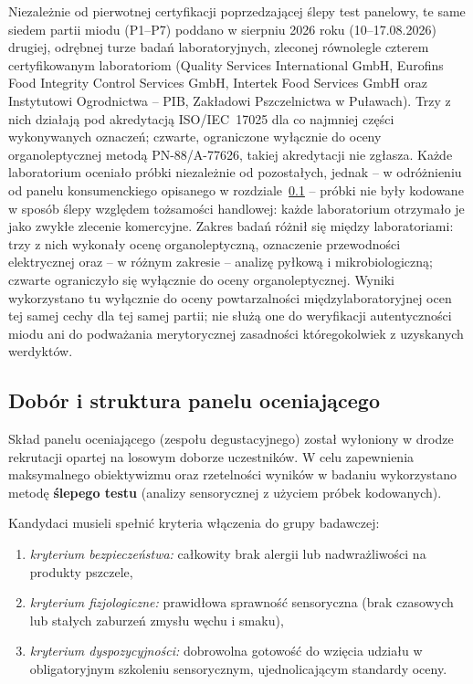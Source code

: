 \documentclass[12pt,a4paper]{article}
\begin{document}
Niezależnie od pierwotnej certyfikacji poprzedzającej ślepy test panelowy, te same
siedem partii miodu (P1--P7) poddano w sierpniu 2026 roku (10--17.08.2026) drugiej,
odrębnej turze badań laboratoryjnych, zleconej równolegle czterem certyfikowanym
laboratoriom (Quality Services International GmbH, Eurofins Food Integrity Control
Services GmbH, Intertek Food Services GmbH oraz Instytutowi Ogrodnictwa -- PIB, Zakładowi
Pszczelnictwa w Puławach). Trzy z nich działają pod akredytacją ISO/IEC~17025 dla co
najmniej części wykonywanych oznaczeń; czwarte, ograniczone wyłącznie do oceny
organoleptycznej metodą PN-88/A-77626, takiej akredytacji nie zgłasza. Każde
laboratorium oceniało próbki niezależnie od pozostałych, jednak -- w odróżnieniu od
panelu konsumenckiego opisanego w rozdziale~\ref{sub:dobor_panelu} -- próbki nie były
kodowane w sposób ślepy względem tożsamości handlowej: każde laboratorium otrzymało je
jako zwykłe zlecenie komercyjne. Zakres badań różnił się między laboratoriami: trzy z
nich wykonały ocenę organoleptyczną, oznaczenie przewodności elektrycznej oraz -- w
różnym zakresie -- analizę pyłkową i mikrobiologiczną; czwarte ograniczyło się wyłącznie
do oceny organoleptycznej. Wyniki wykorzystano tu wyłącznie do oceny powtarzalności
międzylaboratoryjnej ocen tej samej cechy dla tej samej partii; nie służą one do
weryfikacji autentyczności miodu ani do podważania merytorycznej zasadności
któregokolwiek z uzyskanych werdyktów.

\subsection{Dobór i struktura panelu oceniającego}
\label{sub:dobor_panelu}

Skład panelu oceniającego (zespołu degustacyjnego) został wyłoniony w drodze rekrutacji opartej na losowym doborze uczestników. W celu zapewnienia maksymalnego obiektywizmu oraz rzetelności wyników w badaniu wykorzystano metodę \textbf{ślepego testu} (analizy sensorycznej z użyciem próbek kodowanych).

Kandydaci musieli spełnić kryteria włączenia do grupy badawczej:
\begin{enumerate}[label=\roman*.]
    \item \textit{kryterium bezpieczeństwa:} całkowity brak alergii lub nadwrażliwości na produkty pszczele,
    \item \textit{kryterium fizjologiczne:} prawidłowa sprawność sensoryczna (brak czasowych lub stałych zaburzeń zmysłu węchu i smaku),
    \item \textit{kryterium dyspozycyjności:} dobrowolna gotowość do wzięcia udziału w obligatoryjnym szkoleniu sensorycznym, ujednolicającym standardy oceny.
\end{enumerate}
\end{document}
